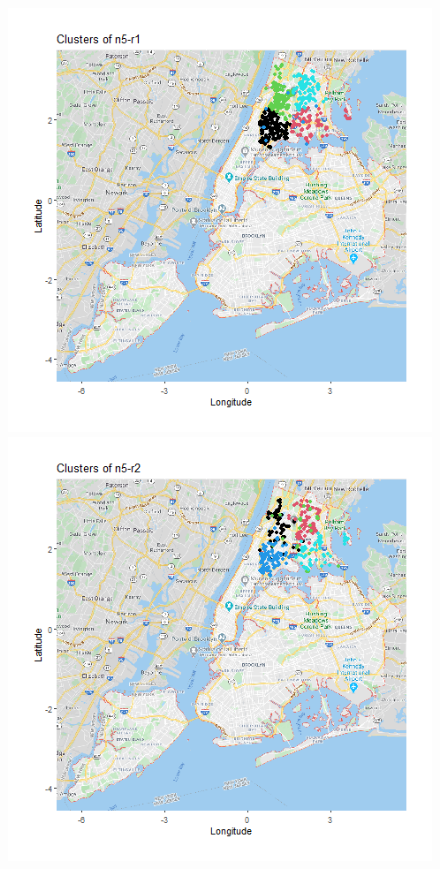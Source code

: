 \documentclass{FR16}
\begin{document}
\begin{itemize}
\begin{figure}[!htb]
   
   \begin{minipage}{0.33\textwidth}
     \centering
     \includegraphics[width=1\linewidth]{figures/clust-n5-r1.png} 
   \end{minipage}\hfill
   \begin{minipage}{0.33\textwidth}
     \centering
     \includegraphics[width=1\linewidth]{figures/clust-n5-r2.png}

\end{minipage}
\end{figure}
\end{itemize}
\end{document}
